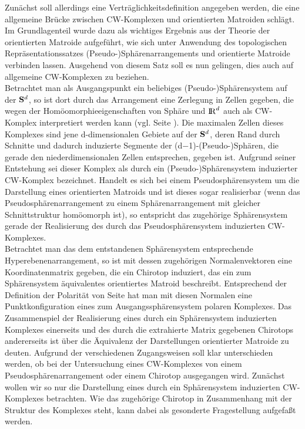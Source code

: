 Zunächst soll allerdings eine Verträglichkeitsdefinition angegeben werden,
die eine allgemeine Brücke zwischen CW-Komplexen und orientierten Matroiden
schlägt.\\
Im Grundlagenteil wurde dazu als wichtiges Ergebnis aus der Theorie der
orientierten Matroide aufgeführt, wie sich unter Anwendung des topologischen
Repräsentationssatzes (Pseudo-)Sphärenarrangements und orientierte Matroide
verbinden lassen. Ausgehend von diesem Satz soll es nun gelingen, dies auch auf
allgemeine CW-Komplexen zu beziehen.\\
Betrachtet man als Ausgangspunkt ein beliebiges (Pseudo-)Sphärensystem auf
der $\S^d$, so ist dort durch das Arrangement eine Zerlegung in Zellen gegeben,
die wegen der Homöomorphieeigenschaften von Sphäre und $\R^d$ auch als
CW-Komplex interpretiert werden kann (vgl. Seite \pageref{cell}). Die maximalen
Zellen dieses Komplexes sind jene d-dimensionalen Gebiete auf der $\S^d$, deren
Rand durch Schnitte und dadurch induzierte Segmente der
(d$-$1)-(Pseudo-)Sphären, die gerade den niederdimensionalen Zellen
entsprechen, gegeben ist. Aufgrund seiner Entstehung sei dieser Komplex als
durch ein (Pseudo-)Sphärensystem induzierter CW-Komplex  bezeichnet. Handelt es sich bei einem Pseudosphärensystem um die
Darstellung eines orientierten Matroids und ist dieses sogar realisierbar (wenn
das Pseudosphärenarrangement zu einem Sphärenarrangement mit gleicher
Schnittstruktur homöomorph ist), so entspricht das zugehörige Sphärensystem
gerade der Realisierung des durch das Pseudosphärensystem induzierten
CW-Komplexes.\\
Betrachtet man das dem entstandenen Sphärensystem entsprechende
Hyperebenenarrangement, so ist mit dessen zugehörigen Normalenvektoren eine
Koordinatenmatrix gegeben, die ein Chirotop induziert, das ein zum
Sphärensystem äquivalentes orientiertes Matroid beschreibt. Entsprechend der
Definition der Polarität von Seite \pageref{polar} hat man mit diesen Normalen
eine Punktkonfiguration eines zum Ausgangssphärensystem polaren Komplexes. Das
Zusammenspiel der Realisierung eines durch ein Sphärensystem induzierten
Komplexes einerseits und des durch die extrahierte Matrix gegebenen Chirotops
andererseits ist über die Äquivalenz der Darstellungen orientierter Matroide
zu deuten. Aufgrund der verschiedenen Zugangsweisen soll klar unterschieden
werden, ob bei der Untersuchung eines CW-Komplexes von einem
Pseudosphärenarrangement oder einem Chirotop ausgegangen wird. Zunächst wollen
wir so nur die Darstellung eines durch ein Sphärensystem induzierten
CW-Komplexes betrachten. Wie das zugehörige Chirotop in Zusammenhang mit der
Struktur des Komplexes steht, kann dabei als gesonderte Fragestellung
aufgefaßt werden.

